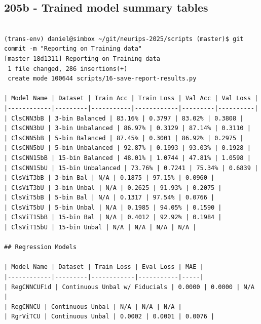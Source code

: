 \subsection{205b - Trained model summary tables}
\label{app_res:205b}

\begin{verbatim}

(trans-env) daniel@simbox ~/git/neurips-2025/scripts (master)$ git commit -m "Reporting on Training data"
[master 18d1311] Reporting on Training data
 1 file changed, 286 insertions(+)
 create mode 100644 scripts/16-save-report-results.py

| Model Name | Dataset | Train Acc | Train Loss | Val Acc | Val Loss |
|------------|---------|-----------|------------|---------|----------|
| ClsCNN3bB | 3-bin Balanced | 83.16% | 0.3797 | 83.02% | 0.3808 |
| ClsCNN3bU | 3-bin Unbalanced | 86.97% | 0.3129 | 87.14% | 0.3110 |
| ClsCNN5bB | 5-bin Balanced | 87.45% | 0.3001 | 86.92% | 0.2975 |
| ClsCNN5bU | 5-bin Unbalanced | 92.87% | 0.1993 | 93.03% | 0.1928 |
| ClsCNN15bB | 15-bin Balanced | 48.01% | 1.0744 | 47.81% | 1.0598 |
| ClsCNN15bU | 15-bin Unbalanced | 73.76% | 0.7241 | 75.34% | 0.6839 |
| ClsViT3bB | 3-bin Bal | N/A | 0.1875 | 97.15% | 0.0960 |
| ClsViT3bU | 3-bin Unbal | N/A | 0.2625 | 91.93% | 0.2075 |
| ClsViT5bB | 5-bin Bal | N/A | 0.1317 | 97.54% | 0.0766 |
| ClsViT5bU | 5-bin Unbal | N/A | 0.1985 | 94.05% | 0.1590 |
| ClsViT15bB | 15-bin Bal | N/A | 0.4012 | 92.92% | 0.1984 |
| ClsViT15bU | 15-bin Unbal | N/A | N/A | N/A | N/A |

## Regression Models

| Model Name | Dataset | Train Loss | Eval Loss | MAE |
|------------|---------|------------|-----------|-----|
| RegCNNCUFid | Continuous Unbal w/ Fiducials | 0.0000 | 0.0000 | N/A |
| RegCNNCU | Continuous Unbal | N/A | N/A | N/A |
| RgrViTCU | Continuous Unbal | 0.0002 | 0.0001 | 0.0076 |


\end{verbatim}
